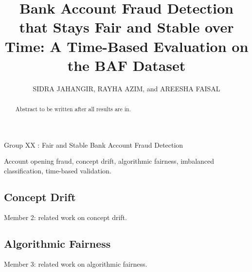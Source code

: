 \documentclass{ieeeaccess}
\begin{document}

\title{Bank Account Fraud Detection that Stays Fair and Stable over Time: A Time-Based Evaluation on the BAF Dataset}

\author{\uppercase{Sidra Jahangir},
\uppercase{Rayha Azim}, and \uppercase{Areesha Faisal}}
\address[1]{Department of Computer Science, Kinnaird College for Women University, Lahore, Pakistan}

{Group XX \headeretal: Fair and Stable Bank Account Fraud Detection}


\begin{abstract}
Abstract to be written after all results are in.
\end{abstract}

\begin{keywords}
Account opening fraud, concept drift, algorithmic fairness, imbalanced classification, time-based validation.
\end{keywords}

\titlepgskip=-15pt

\maketitle




\subsection{Concept Drift}
\label{sec:related-drift}
Member 2: related work on concept drift.

\subsection{Algorithmic Fairness}
\label{sec:related-fair}
Member 3: related work on algorithmic fairness.


\end{document}
